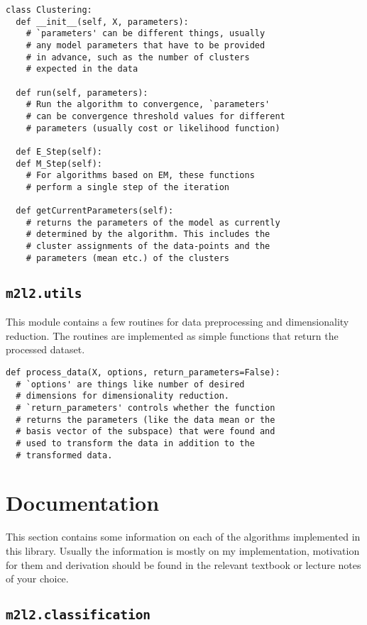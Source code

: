 \documentclass[a4paper, 12pt]{article}
\begin{document}
\begin{lstlisting}[frame=TLbr,breaklines=true]
class Clustering:
  def __init__(self, X, parameters):
    # `parameters' can be different things, usually
    # any model parameters that have to be provided
    # in advance, such as the number of clusters
    # expected in the data
  
  def run(self, parameters):
    # Run the algorithm to convergence, `parameters'
    # can be convergence threshold values for different
    # parameters (usually cost or likelihood function)
  
  def E_Step(self):
  def M_Step(self):
    # For algorithms based on EM, these functions
    # perform a single step of the iteration
    
  def getCurrentParameters(self):
    # returns the parameters of the model as currently
    # determined by the algorithm. This includes the
    # cluster assignments of the data-points and the
    # parameters (mean etc.) of the clusters
\end{lstlisting}

\subsection{\texttt{m2l2.utils}}
This module contains a few routines for data preprocessing and dimensionality reduction. The routines are implemented as simple functions that return the processed dataset.

\begin{lstlisting}[frame=TLbr,breaklines=true]
def process_data(X, options, return_parameters=False):
  # `options' are things like number of desired
  # dimensions for dimensionality reduction.
  # `return_parameters' controls whether the function
  # returns the parameters (like the data mean or the
  # basis vector of the subspace) that were found and
  # used to transform the data in addition to the
  # transformed data.
\end{lstlisting}


\section{Documentation}
This section contains some information on each of the algorithms implemented in this library. Usually the information is mostly on my implementation, motivation for them and derivation should be found in the relevant textbook or lecture notes of your choice.

\subsection{\texttt{m2l2.classification}}
\end{document}
